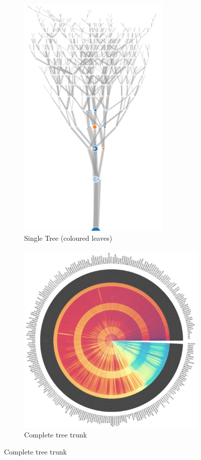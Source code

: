 \begin{figure}[H]
     \centering
     \begin{subfigure}[b]{0.495\textwidth}
         \centering
         \includegraphics[width=0.8\textwidth,height=\textwidth]{figures_c1/tree.png}
         \caption{Single Tree (coloured leaves)}
         \label{fig:1tree}
     \end{subfigure}
     \hfill
     \begin{subfigure}[b]{0.495\textwidth}
         \centering
         \includegraphics[width=\textwidth]{figures_c1/trunk.png}
         \caption{Complete tree trunk}
         \label{fig:trunk}
     \end{subfigure}



\end{figure}
